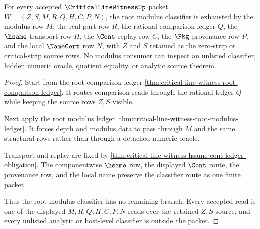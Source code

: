 \begin{theorem}
\label{thm:critical-line-witness-root-modulus-classifier-exhaustion}
For every accepted $\CriticalLineWitnessUp$ packet $W=(Z,S,M,R,Q,H,C,P,N)$, the root modulus classifier is exhausted by the modulus row $M$, the real-part row $R$, the rational comparison ledger $Q$, the $\hsame$ transport row $H$, the $\Cont$ replay row $C$, the $\Pkg$ provenance row $P$, and the local $\NameCert$ row $N$, with $Z$ and $S$ retained as the zero-strip or critical-strip source rows. No modulus consumer can inspect an unlisted classifier, hidden numeric oracle, quotient equality, or analytic source theorem.
\end{theorem}
\begin{proof}
Start from the root comparison ledger \autoref{thm:critical-line-witness-root-comparison-ledger}. It routes comparison reads through the rational ledger $Q$ while keeping the source rows $Z,S$ visible.

Next apply the root modulus ledger \autoref{thm:critical-line-witness-root-modulus-ledger}. It forces depth and modulus data to pass through $M$ and the same structural rows rather than through a detached numeric oracle.

Transport and replay are fixed by \autoref{thm:critical-line-witness-hsame-cont-ledger-obligation}. The componentwise $\hsame$ row, the displayed $\Cont$ route, the provenance row, and the local name preserve the classifier route as one finite packet.

Thus the root modulus classifier has no remaining branch. Every accepted read is one of the displayed $M,R,Q,H,C,P,N$ reads over the retained $Z,S$ source, and every unlisted analytic or host-level classifier is outside the packet.
\end{proof}

